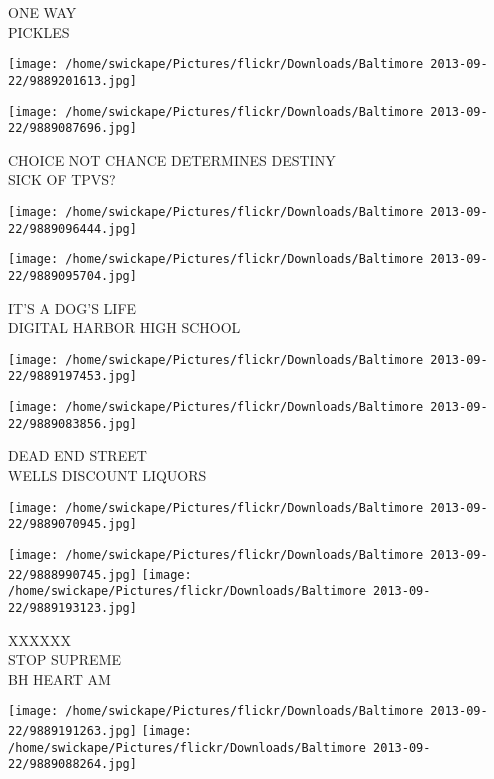 \documentclass[10pt,letterpaper]{article}
\begin{document}
ONE WAY\\
PICKLES\\
\pagebreak

\texttt{[image: /home/swickape/Pictures/flickr/Downloads/Baltimore 2013-09-22/9889201613.jpg]}

\vspace{0.25in}
\texttt{[image: /home/swickape/Pictures/flickr/Downloads/Baltimore 2013-09-22/9889087696.jpg]}

CHOICE NOT CHANCE DETERMINES DESTINY\\
SICK OF TPVS?\\
\pagebreak

\texttt{[image: /home/swickape/Pictures/flickr/Downloads/Baltimore 2013-09-22/9889096444.jpg]}

\vspace{0.25in}
\texttt{[image: /home/swickape/Pictures/flickr/Downloads/Baltimore 2013-09-22/9889095704.jpg]}

IT'S A DOG'S LIFE\\
DIGITAL HARBOR HIGH SCHOOL\\
\pagebreak

\texttt{[image: /home/swickape/Pictures/flickr/Downloads/Baltimore 2013-09-22/9889197453.jpg]}

\vspace{0.25in}
\texttt{[image: /home/swickape/Pictures/flickr/Downloads/Baltimore 2013-09-22/9889083856.jpg]}

DEAD END STREET\\
WELLS DISCOUNT LIQUORS\\
\pagebreak

\texttt{[image: /home/swickape/Pictures/flickr/Downloads/Baltimore 2013-09-22/9889070945.jpg]}

\vspace{0.25in}
\texttt{[image: /home/swickape/Pictures/flickr/Downloads/Baltimore 2013-09-22/9888990745.jpg]}
\texttt{[image: /home/swickape/Pictures/flickr/Downloads/Baltimore 2013-09-22/9889193123.jpg]}

XXXXXX\\
STOP SUPREME\\
BH HEART AM\\
\pagebreak

\texttt{[image: /home/swickape/Pictures/flickr/Downloads/Baltimore 2013-09-22/9889191263.jpg]}
\texttt{[image: /home/swickape/Pictures/flickr/Downloads/Baltimore 2013-09-22/9889088264.jpg]}
\end{document}
